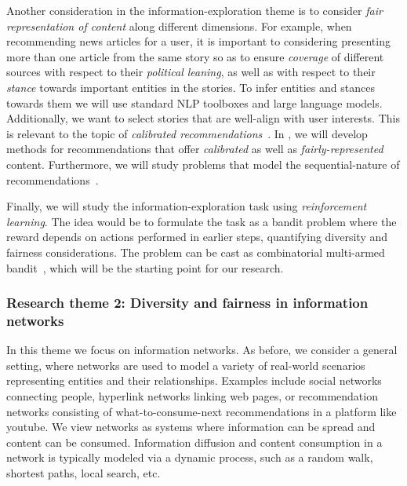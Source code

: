 \documentclass[a4paper,11pt]{article}
\begin{document}
Another consideration in the information-exploration theme
is to consider \emph{fair representation of content} along different dimensions. 
For example, when recommending news articles for a user, 
it is important to considering presenting more than one article from the same story
so as to ensure \emph{coverage} of different sources with respect to their \emph{political leaning}, 
as well as with respect to their \emph{stance} towards important entities in the stories. 
To infer entities and stances towards them we will use standard NLP toolboxes and large language models.
Additionally, we want to select stories that are well-align with user interests. 
This is relevant to the topic of \emph{calibrated recommendations}~\cite{wang2022improving}.
In \acronym, we will develop methods for recommendations that 
offer \emph{calibrated} as well as \emph{fairly-represented} content.
Furthermore, we will study problems that model the sequential-nature of recommendations~\cite{zhang2022ranking}.

Finally, we will study the information-exploration task using \emph{reinforcement learning}.
The idea would be to formulate the task as a bandit problem
where the reward depends on actions performed in earlier steps, 
quantifying diversity and fairness considerations. 
The problem can be cast as combinatorial multi-armed bandit~\cite{chen2013combinatorial}, 
which will be the starting point for our research. 

\subsubsection*{Research theme 2: Diversity and fairness in information networks}

In this theme we focus on information networks. 
As before, we consider a general setting, 
where networks are used to model a variety of real-world scenarios
representing entities and their relationships.
Examples include 
social networks connecting people, 
hyperlink networks linking web pages, or 
recommendation networks consisting of what-to-consume-next recommendations
in a platform like youtube.
We view networks as systems where information can be spread and content can be consumed. 
Information diffusion and content consumption in a network
is typically modeled via a dynamic process, such as a random walk, 
shortest paths, local search, etc.
\end{document}
